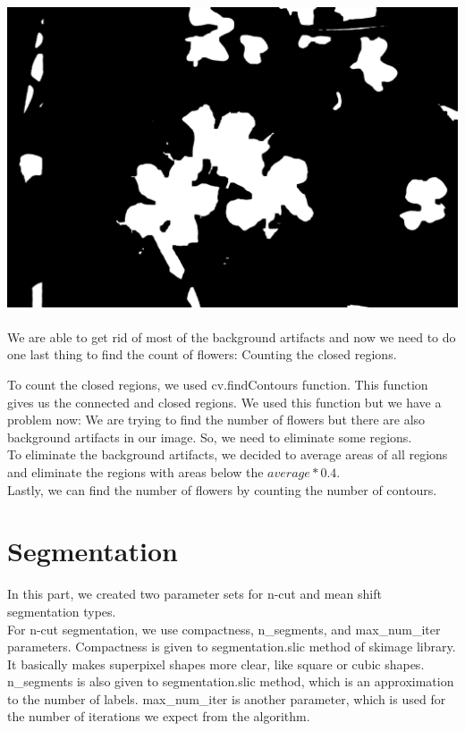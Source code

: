 \documentclass[conference]{IEEEtran}
\begin{document}
\includegraphics[scale=0.04]{A3.png} \\ \\

We are able to get rid of most of the background artifacts and now we need to do one last thing to find the count of flowers: Counting the closed regions.

To count the closed regions, we used cv.findContours function. This function gives us the connected and closed regions. We used this function but we have a problem now: We are trying to find the number of flowers but there are also background artifacts in our image. So, we need to eliminate some regions. \\

To eliminate the background artifacts, we decided to average areas of all regions and eliminate the regions with areas below the $average*0.4$. \\

Lastly, we can find the number of flowers by counting the number of contours.

\section{Segmentation}
In this part, we created two parameter sets for n-cut and mean shift segmentation types.\\

For n-cut segmentation, we use compactness, n\_segments, and max\_num\_iter parameters. Compactness is given to segmentation.slic method of skimage library. It basically makes superpixel shapes more clear, like square or cubic shapes. n\_segments is also given to segmentation.slic method, which is an approximation to the number of labels. max\_num\_iter is another parameter, which is used for the number of iterations we expect from the algorithm. \\
\end{document}
